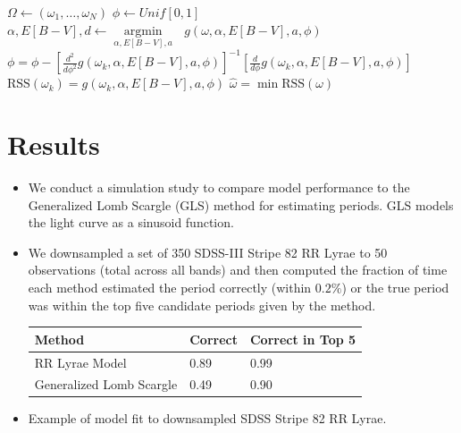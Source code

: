 \documentclass[a0,portrait]{a0poster}
\newcommand{\argmin}[1]{\underset{#1}{\operatorname{argmin}}\text{ }}
\begin{document}
\begin{multicols}{2}
\begin{itemize}
\begin{algorithmic}[1]
  \State $\Omega \gets (\omega_1,\ldots,\omega_N)$ 
  \State $\phi \gets Unif[0,1]$ 
  \State $\alpha,E[B-V],d \gets \argmin{\alpha,E[B-V],a} g(\omega,\alpha,E[B-V],a,\phi)$  
  \State $\phi = \phi - \left[\frac{d^2}{d\phi^2}g(\omega_k,\alpha,E[B-V],a,\phi)\right]^{-1}\left[\frac{d}{d\phi}g(\omega_k,\alpha,E[B-V],a,\phi)\right] $ 
  \EndFor
  \State $\text{RSS}(\omega_k) = g(\omega_k,\alpha,E[B-V],a,\phi)$
  \EndFor
  \State $\widehat{\omega} = \min \text{RSS}(\omega)$
\end{algorithmic}

\end{itemize}


\section*{Results}

\begin{itemize}

\item We conduct a simulation study to compare model performance to the Generalized Lomb Scargle (GLS) method for estimating periods. GLS models the light curve as a sinusoid function.

\item We downsampled a set of 350 SDSS-III Stripe 82 RR Lyrae to 50 observations (total across all bands) and then computed the fraction of time each method estimated the period correctly (within $0.2\%$) or the true period was within the top five candidate periods given by the method.

\begin{center}
\begin{tabular}{l l l}
\toprule
\textbf{Method} & \textbf{Correct} & \textbf{Correct in Top 5}\\
\midrule
RR Lyrae Model  & 0.89 & 0.99 \\
Generalized Lomb Scargle & 0.49  &  0.90\\
\bottomrule
\end{tabular}
\end{center}

\item Example of model fit to downsampled SDSS Stripe 82 RR Lyrae.


\end{itemize}
\end{multicols}
\end{document}
